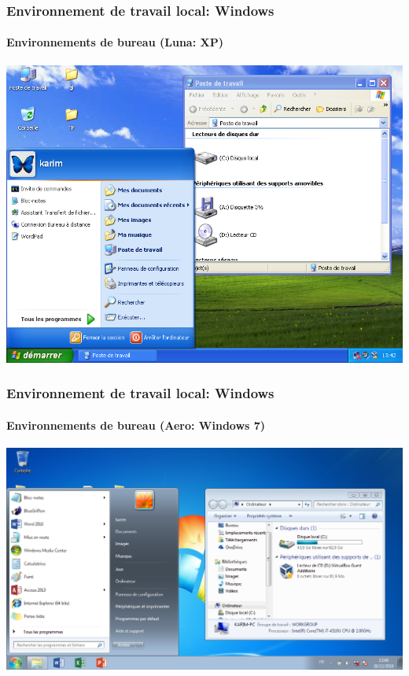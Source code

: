 \documentclass[xcolor=table]{beamer}
\begin{document}
\begin{frame}
\frametitle{Environnement de travail local: Windows}
\framesubtitle{Environnements de bureau (Luna: XP)}

\begin{center}
	\includegraphics[height=
	.8\textheight]{../img/Bweb01-environnement/xp.png}
\end{center}

\end{frame}

\begin{frame}
\frametitle{Environnement de travail local: Windows}
\framesubtitle{Environnements de bureau (Aero: Windows 7)}

\begin{center}
	\includegraphics[height=
	.8\textheight]{../img/Bweb01-environnement/win7.png}
\end{center}

\end{frame}
\end{document}
